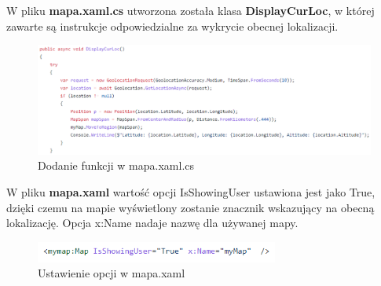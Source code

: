  W pliku \textbf{mapa.xaml.cs} utworzona została klasa \textbf{DisplayCurLoc}, w której zawarte są instrukcje odpowiedzialne za wykrycie obecnej lokalizacji.
 \newline
 \newline
 \begin{figure}[!htb]
 	\begin{center}
 		\includegraphics[width=18cm]{rys/mapa_xaml_cs.png}
 		\caption{Dodanie funkcji w mapa.xaml.cs}
 		\label{rys:rysunek017}
 	\end{center}
 \end{figure}
 
 W pliku \textbf{mapa.xaml} wartość opcji IsShowingUser ustawiona jest jako True, dzięki czemu na mapie wyświetlony zostanie znacznik wskazujący na obecną lokalizację. Opcja x:Name nadaje nazwę dla używanej mapy.
 \newline
\begin{figure}[!htb]
	\begin{center}
		\includegraphics[width=8cm]{rys/mapa_xaml.png}
		\caption{Ustawienie opcji w mapa.xaml}
		\label{rys:rysunek018}
	\end{center}
\end{figure}
   

